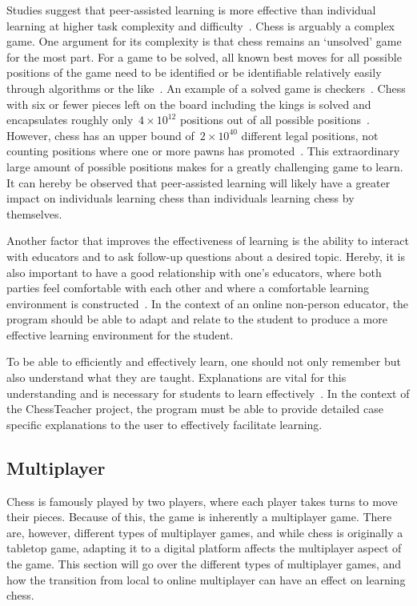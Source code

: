 Studies suggest that peer-assisted learning is more effective than individual learning at higher task complexity and
difficulty~\cite{carson2023}.
Chess is arguably a complex game.
One argument for its complexity is that chess remains an `unsolved' game for the most part.
For a game to be solved, all known best moves for all possible positions of the game need to be identified or be
identifiable relatively easily through algorithms or the like~\cite{herik2002}.
An example of a solved game is checkers~\cite{schaeffer2007}.
Chess with six or fewer pieces left on the board including the kings is solved and encapsulates roughly
only~\( 4 \times 10^{12} \) positions out of all possible positions~\cite{syzygy2024}.
However, chess has an upper bound of~\( 2 \times 10^{40} \) different legal positions, not counting positions where one
or more pawns has promoted~\cite{steinerberger2014}.
This extraordinary large amount of possible positions makes for a greatly challenging game to learn.
It can hereby be observed that peer-assisted learning will likely have a greater impact on individuals learning chess
than individuals learning chess by themselves.

Another factor that improves the effectiveness of learning is the ability to interact with educators and to ask
follow-up questions about a desired topic.
Hereby, it is also important to have a good relationship with one's educators, where both parties feel comfortable with
each other and where a comfortable learning environment is constructed~\cite{saha2009}.
In the context of an online non-person educator, the program should be able to adapt and relate to the student to
produce a more effective learning environment for the student.

To be able to efficiently and effectively learn, one should not only remember but also understand what they are taught.
Explanations are vital for this understanding and is necessary for students to learn effectively~\cite{williams2010}.
In the context of the ChessTeacher project, the program must be able to provide detailed case specific explanations to
the user to effectively facilitate learning.

\subsection{Multiplayer}\label{subsec:multiplayer}

Chess is famously played by two players, where each player takes turns to move their pieces.
Because of this, the game is inherently a multiplayer game.
There are, however, different types of multiplayer games, and while chess is originally a tabletop game, adapting it to
a digital platform affects the multiplayer aspect of the game.
This section will go over the different types of multiplayer games, and how the transition from local to online
multiplayer can have an effect on learning chess.


